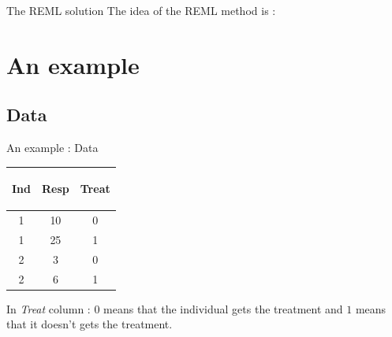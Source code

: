 \documentclass[unknownkeysallowed]{beamer}
\begin{document}
\begin{frame}{The REML solution}
\vspace{1cm}
    The idea of the REML method is : \newline
    \newline
	 \newline
	 \newline
	 \newline
	 \newline
\end{frame}

\section{An example}
\label{sec:example}

\subsection{Data}
\label{sub:Data}

\begin{frame}{An example : Data}
    \begin{table}
        \centering
        \begin{tabular}{| c | c | c|}
        \hline
        \begin{bf} Ind \end{bf} &
        \begin{bf} Resp \end{bf} &
        \begin{bf} Treat \end{bf} \\
        \hline
        1 &  10 & 0\\
        1 & 25 & 1 \\
        2 & 3 & 0 \\
        2 &  6 & 1\\
        \hline
        \end{tabular}
    \end{table}
\vspace{1cm}
In \textit{Treat} column : $0$ means that the individual gets the treatment and $1$ means that it doesn't gets the treatment.
\end{frame}
\end{document}
